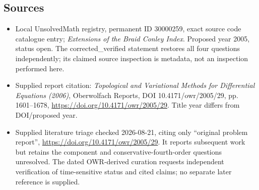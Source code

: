 \documentclass[11pt]{article}
\begin{document}
\subsection{Sources}
\begin{itemize}
\item Local UnsolvedMath registry, permanent ID 30000259, exact source code catalogue entry; \emph{Extensions of the Braid Conley Index}. Proposed year 2005, status open. The corrected\_verified statement restores all four questions independently; its claimed source inspection is metadata, not an inspection performed here.
\item Supplied report citation: \emph{Topological and Variational Methods for Differential Equations (2006)}, Oberwolfach Reports, DOI 10.4171/owr/2005/29, pp. 1601--1678, \url{https://doi.org/10.4171/owr/2005/29}. Title year differs from DOI/proposed year.
\item Supplied literature triage checked 2026-08-21, citing only ``original problem report'', \url{https://doi.org/10.4171/owr/2005/29}. It reports subsequent work but retains the component and conservative-fourth-order questions unresolved. The dated OWR-derived curation requests independent verification of time-sensitive status and cited claims; no separate later reference is supplied.
\end{itemize}
\end{document}
